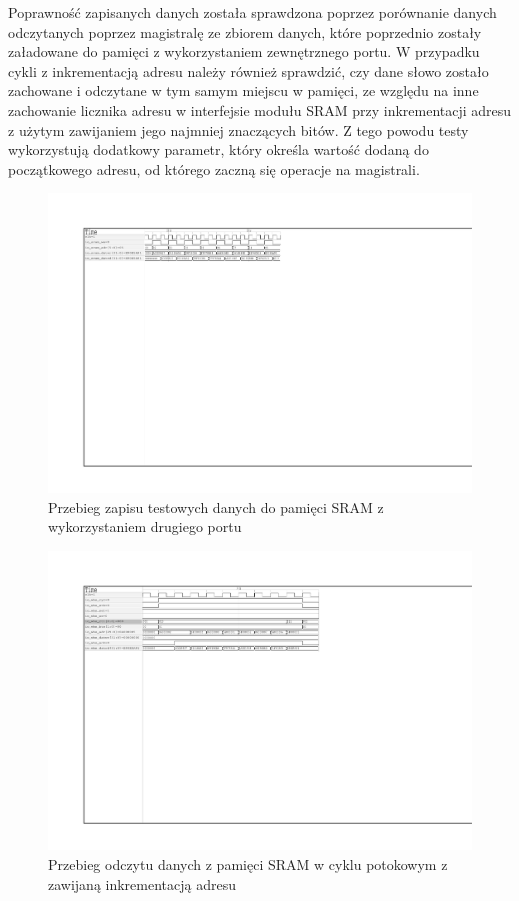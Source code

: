 Poprawność zapisanych danych została sprawdzona poprzez porównanie danych odczytanych poprzez magistralę ze zbiorem danych, które poprzednio zostały załadowane do pamięci z wykorzystaniem zewnętrznego portu. W przypadku cykli z inkrementacją adresu należy również sprawdzić, czy dane słowo zostało zachowane i odczytane w tym samym miejscu w pamięci, ze względu na inne zachowanie licznika adresu w interfejsie modułu SRAM przy inkrementacji adresu z użytym zawijaniem jego najmniej znaczących bitów. Z tego powodu testy wykorzystują dodatkowy parametr, który określa wartość dodaną do początkowego adresu, od którego zaczną się operacje na magistrali.

\begin{figure}[H]
	\centering
	\includegraphics[scale=1,trim={2.54cm 16.2cm 12.3cm 2.9cm},clip]{testing/test-sram-valid-8-2.pdf}
	\caption{Przebieg zapisu testowych danych do pamięci SRAM z wykorzystaniem drugiego portu}
	\label{fig:test-sram-valid-8}
\end{figure}

\begin{figure}[H]
	\centering
	\includegraphics[scale=1,trim={2.54cm 14cm 11.3cm 2.9cm},clip]{testing/test-sram-wrapped-8-2.pdf}
	\caption{Przebieg odczytu danych z pamięci SRAM w cyklu potokowym z zawijaną inkrementacją adresu}
	\label{fig:test-sram-wrapped-8}
\end{figure}

